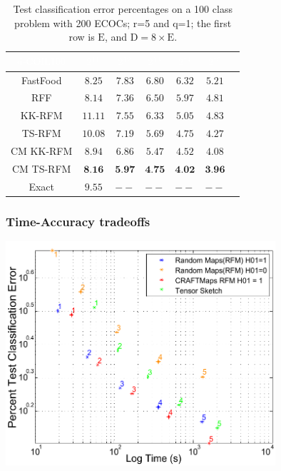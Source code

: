 \documentclass[xcolor=x11names,compress,ignorenonframetext,10pt]{beamer}
\renewcommand{\(}{\begin{columns}}
\renewcommand{\)}{\end{columns}}
\newcommand{\<}[1]{\begin{column}{#1}}
\renewcommand{\>}{\end{column}}
\begin{document}
\begin{frame}
\begin{table}[!t]
\begin{center}
\small{
\begin{tabular}{| c|| c| c| c| c| c| c|}
    \hline
    \rowcolor{gray!170}
    $\textrm{\textcolor{white}{d-COIL100}}$ & $\textcolor{white}{2^{11}}$ & $\textcolor{white}{2^{12}}$ & $\textcolor{white}{2^{13}}$ & $\textcolor{white}{2^{14}}$ & $\textcolor{white}{2^{15}}$\\
    \hline
    \hline
    FastFood & $8.25$ & $7.83$ & $6.80$ & $6.32$ & $5.21$\\\hline
    RFF & $8.14$ & $7.36$ & $6.50$ & $5.97$ & $4.81$\\\hline
    KK-RFM & $11.11$ & $7.55$ & $6.33$ & $5.05$ & $4.83$\\\hline
    TS-RFM & $10.08$ & $7.19$ & $5.69$ & $4.75$ & $4.27$\\\hline
    CM KK-RFM & $8.94$ & $6.86$ & $5.47$ & $4.52$ & $4.08$\\\hline
    CM TS-RFM & $\textbf{8.16}$ & $\textbf{5.97}$ & $\textbf{4.75}$ & $\textbf{4.02}$ & $\textbf{3.96}$\\\hline
    Exact & $9.55$ & $--$ & $--$ & $--$ & $--$\\    
    \hline
  \end{tabular}
}
\caption*{\small{Test classification error percentages on a 100 class problem with 200 ECOCs; r=5 and q=1; the first row is $\mathrm{E}$, and $\mathrm{D}=8 \times \mathrm{E}$.}}
\end{center}
\end{table}
\end{frame}

\begin{frame}
    \frametitle{Time-Accuracy tradeoffs}
    \begin{center}
      \includegraphics[width=0.75\textwidth]{figures/craftmaps/time_analysis}
    \end{center}
\end{frame}
\end{document}
